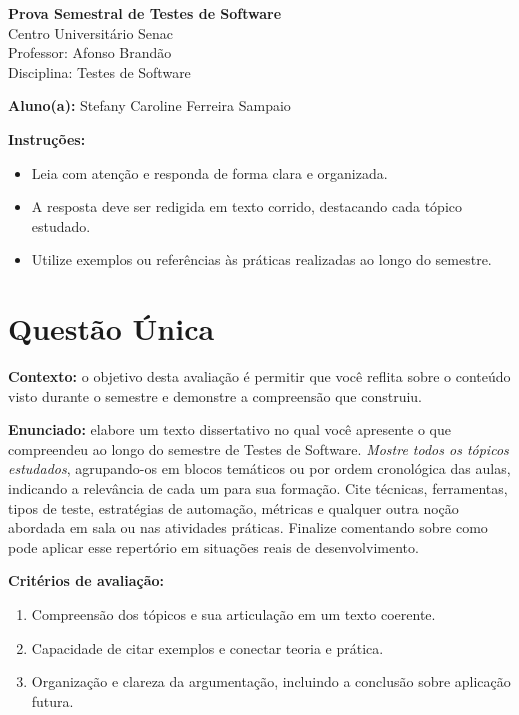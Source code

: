 \documentclass[12pt]{article}
\begin{document}
\newpage


\begin{center}
  {\Large \textbf{Prova Semestral de Testes de Software}}\\
  Centro Universitário Senac\\
  Professor: Afonso Brandão\\
  Disciplina: Testes de Software
\end{center}

\vspace{0.4cm}

\begin{center}
  \textbf{Aluno(a):} Stefany Caroline Ferreira Sampaio
\end{center}

\vspace{0.5cm}

\begin{center}
  \textbf{Instruções:}
\end{center}
\begin{itemize}[leftmargin=*]
  \item Leia com atenção e responda de forma clara e organizada.
  \item A resposta deve ser redigida em texto corrido, destacando cada tópico estudado.
  \item Utilize exemplos ou referências às práticas realizadas ao longo do semestre.
\end{itemize}

\section*{Questão Única}
\textbf{Contexto:} o objetivo desta avaliação é permitir que você reflita sobre o conteúdo visto durante o semestre e demonstre a compreensão que construiu.

\textbf{Enunciado:} elabore um texto dissertativo no qual você apresente o que compreendeu ao longo do semestre de Testes de Software. \textit{Mostre todos os tópicos estudados}, agrupando-os em blocos temáticos ou por ordem cronológica das aulas, indicando a relevância de cada um para sua formação. Cite técnicas, ferramentas, tipos de teste, estratégias de automação, métricas e qualquer outra noção abordada em sala ou nas atividades práticas. Finalize comentando sobre como pode aplicar esse repertório em situações reais de desenvolvimento.

\textbf{Critérios de avaliação:}
\begin{enumerate}[label=\arabic*.]
  \item Compreensão dos tópicos e sua articulação em um texto coerente.
  \item Capacidade de citar exemplos e conectar teoria e prática.
  \item Organização e clareza da argumentação, incluindo a conclusão sobre aplicação futura.
\end{enumerate}
\end{document}
